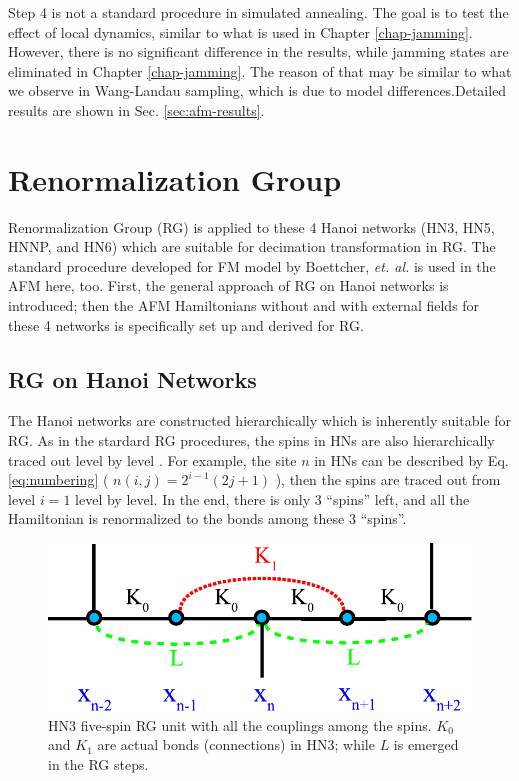 Step 4 is not a standard procedure in simulated annealing. The goal is to test the effect of local dynamics, similar to what is used in Chapter \ref{chap-jamming}. However, there is no significant difference in the results, while jamming states are eliminated in Chapter \ref{chap-jamming}. The reason of that may be similar to what we observe in Wang-Landau sampling, which is due to model differences.Detailed results are shown in Sec. \ref{sec:afm-results}.



\section{Renormalization Group}
\label{sec:afm-rg}
Renormalization Group (RG) is applied to these 4 Hanoi networks (HN3, HN5, HNNP, and HN6) which are suitable for decimation transformation in RG. The standard procedure developed for FM model by Boettcher, {\it et. al.} \cite{Boettcher2011HNNP, boettcher2015classification} is used in the AFM here, too. First, the general approach of RG on Hanoi networks is introduced; then the AFM Hamiltonians without and with external fields for these 4 networks is specifically set up and derived for RG.


\subsection{RG on Hanoi Networks}
\label{sec:afm-rghns}
The Hanoi networks are constructed hierarchically which is inherently suitable for RG. As in the stardard RG procedures, the spins in HNs are also hierarchically traced out level by level \cite{Boettcher2011HNNP, brunson2014rg}. For example, the site $n$ in HNs can be described by Eq. \ref{eq:numbering} ( $n(i,j)=2^{i-1}(2j+1)$ ), then the spins are traced out from level $i=1$ level by level. In the end, there is only 3 \enquote{spins} left, and all the Hamiltonian is renormalized to the bonds among these 3  \enquote{spins}.

\begin{figure}
\centering \includegraphics[scale=0.68]{Chapter-3/RG3hanoi}
\protect\caption{HN3 five-spin RG unit with all the couplings among the spins. $K_0$ and $K_1$ are actual bonds (connections) in HN3; while $L$ is emerged in the RG steps.}
\label{fig:afm-hn3rgbefore} 
\end{figure}


